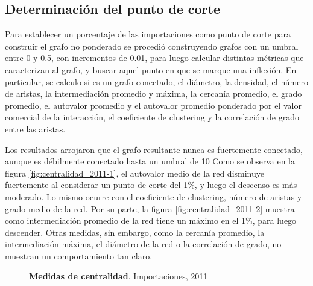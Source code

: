 \documentclass[runningheads,a4paper]{llncs}
\begin{document}
\subsection{Determinación del punto de corte}


Para establecer un porcentaje de las importaciones como punto de corte para construir el grafo no ponderado se procedió construyendo grafos con un umbral entre 0 y 0.5, con incrementos de 0.01, para luego calcular distintas métricas que caracterizan al grafo, y buscar aquel punto en que se marque una inflexión. En particular, se calculo si es un grafo conectado, el diámetro, la densidad, el número de aristas, la intermediación promedio y máxima, la cercanía promedio, el grado promedio, el autovalor promedio y el autovalor promedio ponderado por el valor comercial de la interacción, el coeficiente de clustering y la correlación de grado entre las aristas.

Los resultados arrojaron que el grafo resultante nunca es fuertemente conectado, aunque es débilmente conectado hasta un umbral de 10%
Como se observa en la figura \ref{fig:centralidad_2011-1}, el autovalor medio de la red disminuye fuertemente al considerar un punto de corte del 1\%, y luego el descenso es más moderado. Lo mismo ocurre con el coeficiente de clustering, número de aristas y grado medio de la red. Por su parte, la figura \ref{fig:centralidad_2011-2} muestra como intermediación promedio de la red tiene un máximo en el 1\%, para luego descender. Otras medidas, sin embargo, como la cercanía promedio, la intermediación máxima, el diámetro de la red o la correlación de grado, no muestran un comportamiento tan claro.

\begin{figure}
\centering
{}
\caption{\textbf{Medidas de centralidad}. Importaciones, 2011}
\label{fig:centralidad_2011}
\end{figure}
\end{document}
